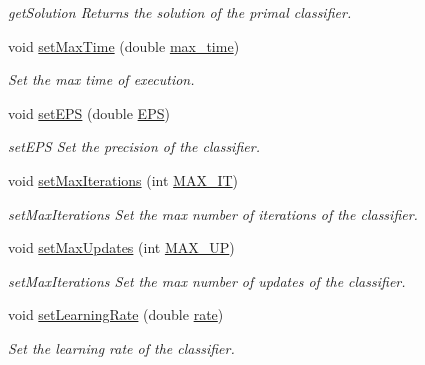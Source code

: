 \begin{DoxyCompactItemize}
\begin{DoxyCompactList}\small\item\em get\+Solution Returns the solution of the primal classifier. \end{DoxyCompactList}\item 
void \hyperlink{class_classifier_a5da324a0de94b7171484f3b1f1f22fbd}{set\+Max\+Time} (double \hyperlink{class_classifier_a191089f044af0f4dd51f37aaff78d8f6}{max\+\_\+time})
\begin{DoxyCompactList}\small\item\em Set the max time of execution. \end{DoxyCompactList}\item 
void \hyperlink{class_classifier_a9cc5a1d92243f9d9b530347be1ac7367}{set\+E\+PS} (double \hyperlink{class_classifier_ad7cd0cfea68461340df2adb0c132dc93}{E\+PS})
\begin{DoxyCompactList}\small\item\em set\+E\+PS Set the precision of the classifier. \end{DoxyCompactList}\item 
void \hyperlink{class_classifier_a58540f77a22c0f1774d0089fac713498}{set\+Max\+Iterations} (int \hyperlink{class_classifier_a9cab88ab4489d771256bffb1717c1644}{M\+A\+X\+\_\+\+IT})
\begin{DoxyCompactList}\small\item\em set\+Max\+Iterations Set the max number of iterations of the classifier. \end{DoxyCompactList}\item 
void \hyperlink{class_classifier_ad8930d5e6002299bdb840d4542229f02}{set\+Max\+Updates} (int \hyperlink{class_classifier_abb8b95854801151e78a1d9f6a2173c22}{M\+A\+X\+\_\+\+UP})
\begin{DoxyCompactList}\small\item\em set\+Max\+Iterations Set the max number of updates of the classifier. \end{DoxyCompactList}\item 
void \hyperlink{class_classifier_a8f6818bd403afbb46d1bfd75c9731ab6}{set\+Learning\+Rate} (double \hyperlink{class_classifier_af9867e5919742de1303dd971a9a1c19a}{rate})
\begin{DoxyCompactList}\small\item\em Set the learning rate of the classifier. \end{DoxyCompactList}\end{DoxyCompactItemize}
